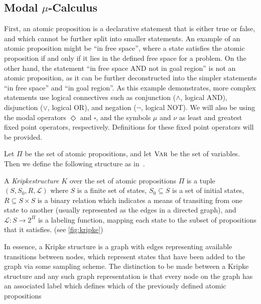 \subsection{\texorpdfstring{Modal $\mu$-Calculus}{Modal mu-Calculus} }
First, an atomic proposition is a declarative statement that is either true or false, and which cannot be further split into smaller statements. An example of an atomic proposition might be ``in free space'', where a state satisfies the atomic proposition if and only if it lies in the defined free space for a problem. On the other hand, the statement ``in free space AND not in goal region'' is not an atomic proposition, as it can be further deconstructed into the simpler statements ``in free space'' and ``in goal region''. As this example demonstrates, more complex statements use logical connectives such as conjunction ($\land$, logical AND), disjunction ($\lor$, logical OR), and negation ($\lnot$, logical NOT). We will also be using the modal operators $\Diamond$ and $\square$, and the symbols $\mu$ and $\nu$ as least and greatest fixed point operators, respectively. Definitions for these fixed point operators will be provided.

Let $\Pi$ be the set of atomic propositions, and let $\textsc{Var}$ be the set of variables. Then we define the following structure as in~\cite{Karaman2009}.
\begin{defn}\label{defn:kripke}
    A {\em Kripke\/structure} $K$ over the set of atomic propositions $\Pi$ is a tuple $(S,S_0,R,\mathcal{L})$ where $S$ is a finite set of states, $S_0 \subseteq S$ is a set of initial states,  $R \subseteq S \times S$ is a binary relation which indicates a means of transiting from one state to another (usually represented as the edges in a directed graph), and $\mathcal{L}:S \to 2^\Pi$ is a labeling function, mapping each state to the subset of propositions that it satisfies. (see \autoref{fig:kripke})
\end{defn}

In essence, a Kripke structure is a graph with edges representing available transitions between nodes, which represent states that have been added to the graph via some sampling scheme. The distinction to be made between a Kripke structure and any such graph representation is that every node on the graph has an associated label which defines which of the previously defined atomic propositions 

